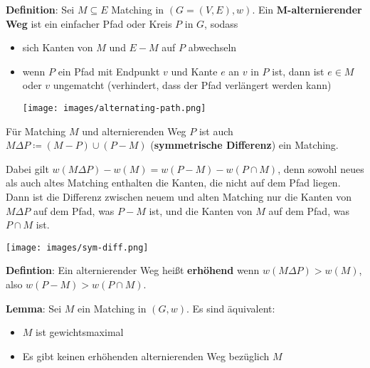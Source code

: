 \bigskip
\textbf{Definition}: Sei $M\subseteq E$ Matching in $(G = (V, E), w)$. Ein \textbf{$\mathbf{M}$-alternierender Weg} ist ein einfacher Pfad oder Kreis $P$ in $G$, sodass
\begin{itemize}
	\item sich Kanten von $M$ und $E- M$ auf $P$ abwechseln
	\item wenn $P$ ein Pfad mit Endpunkt $v$ und Kante $e$ an $v$ in $P$ ist, dann ist $e\in M$ oder $v$ ungematcht (verhindert, dass der Pfad verlängert werden kann)
	\begin{center}
		\texttt{[image: images/alternating-path.png]}
	\end{center}
\end{itemize}
Für Matching $M$ und alternierenden Weg $P$ ist auch $M\Delta P\coloneqq (M- P)\cup(P-M)$ (\textbf{symmetrische Differenz}) ein Matching.

Dabei gilt $w(M\Delta P)-w(M)=w(P- M)-w(P\cap M)$, denn sowohl neues als auch altes Matching enthalten die Kanten, die nicht auf dem Pfad liegen. Dann ist die Differenz zwischen neuem und alten Matching nur die Kanten von $M\Delta P$ auf dem Pfad, was $P-M$ ist, und die Kanten von $M$ auf dem Pfad, was $P\cap M$ ist.

\begin{center}
	\texttt{[image: images/sym-diff.png]}
\end{center}
\bigskip
\textbf{Defintion}: Ein alternierender Weg heißt \textbf{erhöhend} wenn $w(M\Delta P)>w(M)$, also $w(P-M)>w(P\cap M)$.\\
\pagebreak

\textbf{Lemma}: Sei $M$ ein Matching in $(G, w)$. Es sind äquivalent:
\begin{itemize}
	\item $M$ ist gewichtsmaximal
	\item Es gibt keinen erhöhenden alternierenden Weg bezüglich $M$
\end{itemize}

